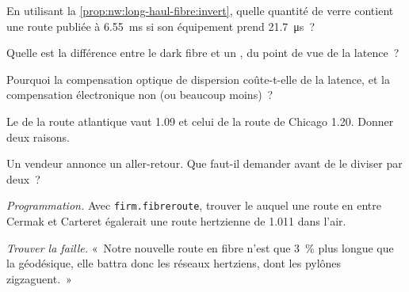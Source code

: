 \begin{exercise}[$\star$]\label{exo:nw:long-haul-fibre:2}
En utilisant la \cref{prop:nw:long-haul-fibre:invert}, quelle quantité de verre contient une route publiée à \qty{6.55}{\milli\second} si son équipement prend
\qty{21.7}{\micro\second}~?
\end{exercise}

\begin{exercise}[$\star$]\label{exo:nw:long-haul-fibre:3}
Quelle est la différence entre le dark fibre et un , du point de vue de la latence~?
\end{exercise}

\begin{exercise}[$\star\star$]\label{exo:nw:long-haul-fibre:4}
Pourquoi la compensation optique de dispersion coûte-t-elle de la latence, et la compensation électronique non (ou beaucoup moins)~?
\end{exercise}

\begin{exercise}[$\star\star$]\label{exo:nw:long-haul-fibre:5}
Le  de la route atlantique vaut 1.09 et celui de la route de Chicago 1.20. Donner deux raisons.
\end{exercise}

\begin{exercise}[$\star\star$]\label{exo:nw:long-haul-fibre:6}
Un vendeur annonce un aller-retour. Que faut-il demander avant de le diviser par deux~?
\end{exercise}

\begin{exercise}[$\star\star\star$]\label{exo:nw:long-haul-fibre:7}
\emph{Programmation.} Avec \texttt{firm.fibreroute}, trouver le  auquel une route en  entre Cermak et Carteret égalerait une
route hertzienne de  1.011 dans l'air.
\end{exercise}

\begin{exercise}[$\star\star\star$]\label{exo:nw:long-haul-fibre:8}
\emph{Trouver la faille.} «~Notre nouvelle route en fibre n'est que 3~\% plus longue que la géodésique, elle battra donc les réseaux hertziens, dont les pylônes zigzaguent.~»
\end{exercise}

